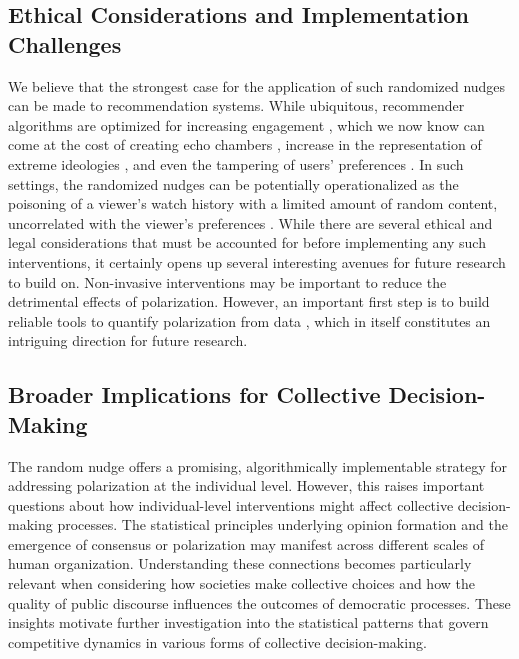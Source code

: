 \subsection{Ethical Considerations and Implementation Challenges}

We believe that the strongest case for the application of such randomized nudges can be made to recommendation systems. While ubiquitous, recommender algorithms are optimized for increasing engagement \cite{recommender-systems-and-their-ethical-challenges}, which we now know can come at the cost of creating echo chambers \cite{echo-chambers-in-collaborative-filtering-based-recommendation-systems}, increase in the representation of extreme ideologies \cite{recommender-systems-and-the-amplification-of-extremist-content}, and even the tampering of users' preferences \cite{user-tampering}. In such settings, the randomized nudges can be potentially operationalized as the poisoning of a viewer's watch history with a limited amount of random content, uncorrelated with the viewer's preferences \cite{youtube-audit}. While there are several ethical and legal considerations that must be accounted for before implementing any such interventions, it certainly opens up several interesting avenues for future research to build on. Non-invasive interventions may be important to reduce the detrimental effects of polarization. However, an important first step is to build reliable tools to quantify polarization from data \cite{hohmann2023quantifying}, which in itself constitutes an intriguing direction for future research.

\subsection{Broader Implications for Collective Decision-Making}

The random nudge offers a promising, algorithmically implementable strategy for addressing polarization at the individual level. However, this raises important questions about how individual-level interventions might affect collective decision-making processes. The statistical principles underlying opinion formation and the emergence of consensus or polarization may manifest across different scales of human organization. Understanding these connections becomes particularly relevant when considering how societies make collective choices and how the quality of public discourse influences the outcomes of democratic processes. These insights motivate further investigation into the statistical patterns that govern competitive dynamics in various forms of collective decision-making. 